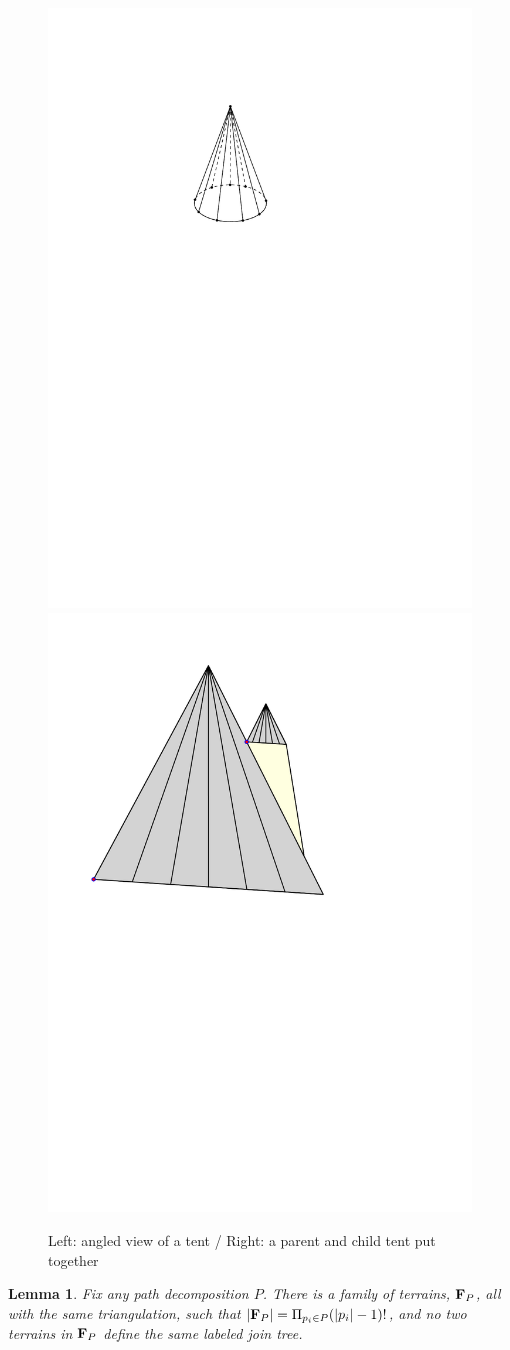 \documentclass[11pt]{article}
\newtheorem{lemma}[theorem]{Lemma}
\theoremstyle{definition}
\newcommand{\bF}{{\bf F}}
\begin{document}
\begin{figure}[h]\centering
    \includegraphics[width=.18\linewidth]{figs/diamond}\hspace{2cm}
    \includegraphics[width=.3\linewidth]{figs/cones}
    \caption{Left: angled view of a tent / Right: a parent and child tent put together}
    \label{fig:diamond}
\end{figure}

\begin{lemma}
\label{lem:pathDecomp}
Fix any path decomposition $P$. There is a family of terrains, $\bF_P$, all with the same triangulation, 
such that $|\bF_P| = \Pi_{p_i\in P} (|p_i|-1)!$, and no two terrains in $\bF_P$ define the same labeled join tree.
\end{lemma}
\end{document}

